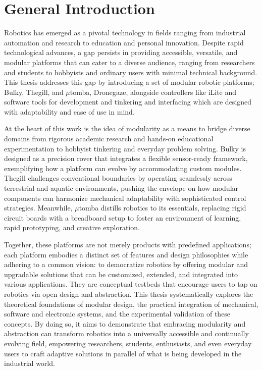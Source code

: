 \chapter*{General Introduction}
Robotics has emerged as a pivotal technology in fields ranging from industrial automation and research to education and personal innovation. Despite rapid technological advances, a gap persists in providing accessible, versatile, and modular platforms that can cater to a diverse audience, ranging from researchers and students to hobbyists and ordinary users with minimal technical background. This thesis addresses this gap by introducing a set of modular robotic platforms; Bulky, Thegill, and $\mu$tomba, Dronegaze, alongside controllers like iLite and software tools for development and tinkering and interfacing which are designed with adaptability and ease of use in mind.

At the heart of this work is the idea of modularity as a means to bridge diverse domains from rigorous academic research and hands-on educational experimentation to hobbyist tinkering and everyday problem solving. Bulky is designed as a precision rover that integrates a flexible sensor-ready framework, exemplifying how a platform can evolve by accommodating custom modules. Thegill challenges conventional boundaries by operating seamlessly across terrestrial and aquatic environments, pushing the envelope on how modular components can harmonize mechanical adaptability with sophisticated control strategies. Meanwhile, $\mu$tomba distills robotics to its essentials, replacing rigid circuit boards with a breadboard setup to foster an environment of learning, rapid prototyping, and creative exploration.

Together, these platforms are not merely products with predefined applications; each platform embodies a distinct set of features and design philosophies while adhering to a common vision: to democratize robotics by offering modular and upgradable solutions that can be customized, extended, and integrated into various applications. They are conceptual testbeds that encourage users to tap on robotics via open design and abstraction. This thesis systematically explores the theoretical foundations of modular design, the practical integration of mechanical, software and electronic systems, and the experimental validation of these concepts. By doing so, it aims to demonstrate that embracing modularity and abstraction can transform robotics into a universally accessible and continually evolving field, empowering researchers, students, enthusiasts, and even everyday users to craft adaptive solutions in parallel of what is being developed in the industrial world.


